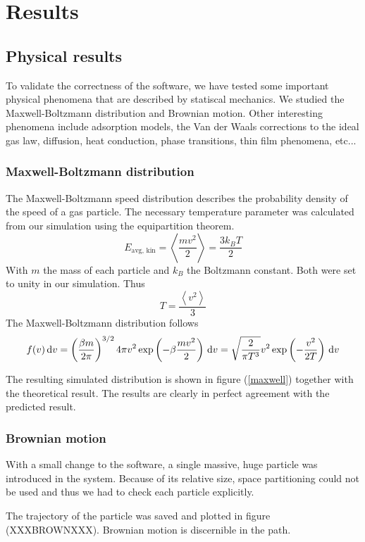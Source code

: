 \section{Results}
\subsection{Physical results}

To validate the correctness of the software, we have tested some important 
physical phenomena that are described by statiscal mechanics. We studied the 
Maxwell-Boltzmann distribution and Brownian motion. Other interesting phenomena 
include adsorption models, the Van der Waals corrections to the ideal gas law, 
diffusion, heat conduction, phase transitions, thin film phenomena, etc...

\subsubsection{Maxwell-Boltzmann distribution}
The Maxwell-Boltzmann speed distribution describes the probability density of 
the speed of a gas particle. The necessary temperature parameter was calculated 
from our simulation using the equipartition theorem.
$$
E_{\textrm{avg, kin}} = \left< \frac{mv^2}{2} \right> = \frac{3k_BT}{2}
$$
With $m$ the mass of each particle and $k_B$ the Boltzmann constant. Both were 
set to unity in our simulation. Thus
$$
T = \frac{\left< v^2 \right>}{3}
$$
The Maxwell-Boltzmann distribution follows
$$
f(v)\,\mathrm d v = \left( \frac{\beta m}{2 \pi} \right)^{3/2} 4 \pi v^2
\exp\left( -\beta \frac{mv^2}{2}\right) \,\mathrm d v =
\sqrt{ \frac{2}{\pi T^3} } v^2 \exp \left(-\frac{v^2}{2T}\right) \,\mathrm d v
$$

The resulting simulated distribution is shown in figure (\ref{maxwell}) 
together with the theoretical result. The results are clearly in perfect 
agreement with the predicted result.

\subsubsection{Brownian motion}
With a small change to the software, a single massive, huge particle was 
introduced in the system. Because of its relative size, space partitioning 
could not be used and thus we had to check each particle explicitly. 

The trajectory of the particle was saved and plotted in figure (XXXBROWNXXX).  
Brownian motion is discernible in the path.


